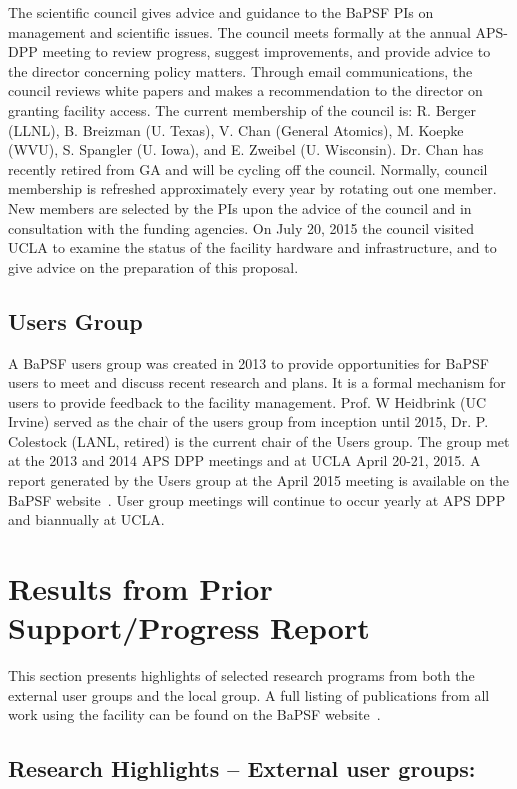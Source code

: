 \documentclass[11pt]{article}
\renewcommand{\cite}{\citep}
\begin{document}
The scientific council gives advice and guidance to the BaPSF PIs on
management and scientific issues. The council meets formally at the
annual APS-DPP meeting to review progress, suggest improvements, and
provide advice to the director concerning policy matters. Through email
communications, the council reviews white papers and makes a
recommendation to the director on granting facility access. The current
membership of the council is: R. Berger (LLNL), B. Breizman (U. Texas),
V. Chan (General Atomics), M. Koepke (WVU), S. Spangler (U. Iowa), and
E. Zweibel (U. Wisconsin). Dr. Chan has recently retired from GA and
will be cycling off the council. Normally, council membership is
refreshed approximately every year by rotating out one member. New
members are selected by the PIs upon the advice of the council and in
consultation with the funding agencies. On July 20, 2015 the council
visited UCLA to examine the status of the facility hardware and
infrastructure, and to give advice on the preparation of this proposal.


\subsection{Users Group}

A BaPSF users group was created in 2013 to provide opportunities for
BaPSF users to meet and discuss recent research and plans.  It is a formal
mechanism for users to provide feedback to the facility
management. Prof. W Heidbrink (UC Irvine) served as the chair of the
users group from inception until 2015, Dr. P. Colestock (LANL,
retired) is the current chair of the Users group.  The group met at
the 2013 and 2014 APS DPP meetings and at UCLA April 20-21, 2015.  A
report generated by the Users group at the April 2015 meeting is
available on the BaPSF website~\cite{bapsfweb}. User group meetings will
continue to occur yearly at APS DPP and biannually at UCLA.


\section{Results from Prior Support/Progress Report}

This section presents highlights of selected research programs from
both the external user groups and the local group.   A full listing of
publications from all work using the facility can be found on the
BaPSF website~\cite{bapsfweb}.

\subsection{Research Highlights -- External user groups:}
\end{document}
